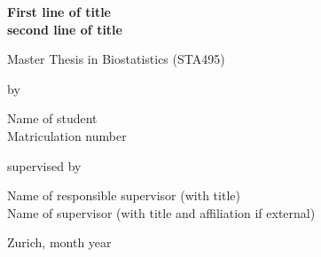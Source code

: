 \renewcommand\familydefault{\sfdefault} 


\thispagestyle{empty}
\renewcommand{\baselinestretch}{1.5}\normalfont
\begin{center}
\setlength{\parindent}{0cm}
\bf\Large%
First line of title \\
second line of title
\normalfont



\hrulefill

\vspace*{4cm}

\large
Master Thesis in Biostatistics (STA495) %
\vspace*{12mm}

by

\vspace*{12mm}

Name of student\\
\small Matriculation number\\
\normalfont
\vspace*{4cm}

supervised by

\vspace*{1cm}

Name of responsible supervisor (with title)\\
Name of supervisor (with title and affiliation if external)

\vfill

Zurich, month year
\end{center}
\renewcommand\familydefault{\rmdefault}%
\renewcommand{\baselinestretch}{1.0}\rm 
\setcounter{page}{0}
\newpage
\vspace*{12cm}~\thispagestyle{empty}
\newpage
